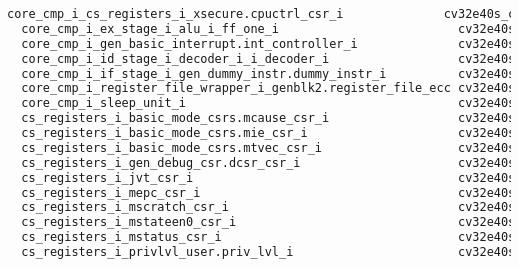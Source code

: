 \begin{lstlisting}[caption={Area report from synthesis of the CV32E40SDC.}, label=lst:cv32e40dc_area, language=txt]
  core_cmp_i_cs_registers_i_xsecure.cpuctrl_csr_i              cv32e40s_csr_LIB0_WIDTH32_SHADOWCOPY1_RESETVALUE25          21     32.832    28.376       61.208 
  core_cmp_i_ex_stage_i_alu_i_ff_one_i                         cv32e40s_ff_one                                             52     85.158    50.347      135.505 
  core_cmp_i_gen_basic_interrupt.int_controller_i              cv32e40s_int_controller                                     79    211.698    53.007      264.705 
  core_cmp_i_id_stage_i_decoder_i_i_decoder_i                  cv32e40s_i_decoder_CLIC0                                   168    251.370   159.896      411.266 
  core_cmp_i_if_stage_i_gen_dummy_instr.dummy_instr_i          cv32e40s_dummy_instr                                        56    126.882    59.469      186.351 
  core_cmp_i_register_file_wrapper_i_genblk2.register_file_ecc cv32e40s_register_file_ecc_REGFILE_NUM_READ_PORTS2         190    462.384   150.451      612.835 
  core_cmp_i_sleep_unit_i                                      cv32e40s_sleep_unit_LIB0                                     6     19.152     3.326       22.478 
  cs_registers_i_basic_mode_csrs.mcause_csr_i                  cv32e40s_csr_LIB0_WIDTH32_SHADOWCOPY1_RESETVALUE0_          29     43.776    39.057       82.833 
  cs_registers_i_basic_mode_csrs.mie_csr_i                     cv32e40s_csr_LIB0_WIDTH32_SHADOWCOPY1_RESETVALUE0_          44     69.084    60.059      129.143 
  cs_registers_i_basic_mode_csrs.mtvec_csr_i                   cv32e40s_csr_LIB0_WIDTH32_SHADOWCOPY1_RESETVALUE1_          62     96.102    84.367      180.469 
  cs_registers_i_gen_debug_csr.dcsr_csr_i                      cv32e40s_csr_LIB0_WIDTH32_SHADOWCOPY1_RESETVALUE10          24     35.568    33.868       69.436 
  cs_registers_i_jvt_csr_i                                     cv32e40s_csr_LIB0_WIDTH32_SHADOWCOPY1_RESETVALUE0_          62     96.102    84.367      180.469 
  cs_registers_i_mepc_csr_i                                    cv32e40s_csr_LIB0_WIDTH32_SHADOWCOPY1_RESETVALUE0_          72    113.886    98.736      212.622 
  cs_registers_i_mscratch_csr_i                                cv32e40s_csr_LIB0_WIDTH32_SHADOWCOPY1_RESETVALUE0_          75    116.964   102.062      219.026 
  cs_registers_i_mstateen0_csr_i                               cv32e40s_csr_LIB0_WIDTH32_SHADOWCOPY1_RESETVALUE0_           2      3.078     2.585        5.663 
  cs_registers_i_mstatus_csr_i                                 cv32e40s_csr_LIB0_WIDTH32_SHADOWCOPY1_RESETVALUE61          14     22.572    19.519       42.091 
  cs_registers_i_privlvl_user.priv_lvl_i                       cv32e40s_csr_LIB0_WIDTH2_SHADOWCOPY1_RESETVALUE3_M           5      7.524     6.272       13.796 

\end{lstlisting}
